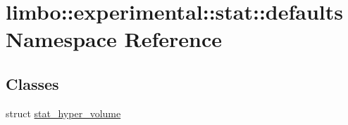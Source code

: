 \hypertarget{namespacelimbo_1_1experimental_1_1stat_1_1defaults}{}\section{limbo\+:\+:experimental\+:\+:stat\+:\+:defaults Namespace Reference}
\label{namespacelimbo_1_1experimental_1_1stat_1_1defaults}
\subsection*{Classes}
\begin{DoxyCompactItemize}
\item 
struct \hyperlink{structlimbo_1_1experimental_1_1stat_1_1defaults_1_1stat__hyper__volume}{stat\+\_\+hyper\+\_\+volume}
\end{DoxyCompactItemize}
